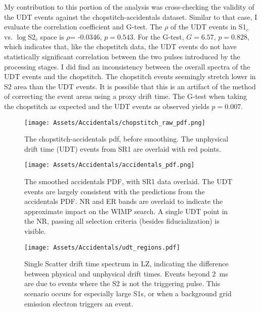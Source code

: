 My contribution to this portion of the analysis was cross-checking the validity of the UDT events against the chopstitch-accidentals dataset.
Similar to that case, I evaluate the correlation coefficient and G-test.
The $\rho$ of the UDT events in S1$_c$ vs. $\log$S2$_c$ space is $\rho$= -0.0346, $p = 0.543$.
For the G-test, $G= 6.57$, $p = 0.828$, which indicates that, like the chopstitch data, the UDT events do not have statistically significant correlation between the two pulses introduced by the processing stages.
I did find an inconsistency between the overall spectra of the UDT events and the chopstitch. 
The chopstitch events seemingly stretch lower in S2 area than the UDT events.
It is possible that this is an artifact of the method of correcting the event areas using a proxy drift time.
The G-test when taking the chopstitch as expected and the UDT events as observed yields $p=0.007$.


\begin{figure}
    \centering
    \texttt{[image: Assets/Accidentals/chopstitch\_raw\_pdf.png]}
    \caption[The chopstitch-accidentals pdf, before smoothing. ]%
    {The chopstitch-accidentals pdf, before smoothing. 
    The unphysical drift time (UDT) events from SR1 are overlaid with red points.}
    \label{fig:chopstitch_pdf}
\end{figure}

\begin{figure}
    \centering
    \texttt{[image: Assets/Accidentals/accidentals\_pdf.png]}
    \caption[The smoothed accidentals PDF, with SR1  data overlaid. ]%
    {The smoothed accidentals PDF, with SR1  data overlaid. 
    The UDT events are largely consistent with the predictions from the accidentals PDF.
    NR and ER bands are overlaid to indicate the approximate impact on the WIMP search.
    A single UDT point in the NR, passing all selection criteria (besides fiducialization) is visible. }
    \label{fig:accidentals_pdf}
\end{figure}


\begin{figure}
    \centering
    \texttt{[image: Assets/Accidentals/udt\_regions.pdf]}
    \caption[Single Scatter drift time spectrum in LZ, indicating the difference between physical and unphysical drift times.]%
    {Single Scatter drift time spectrum in LZ, indicating the difference between physical and unphysical drift times.
    Events beyond 2~ms are due to events where the S2 is not the triggering pulse.
    This scenario occurs for especially large S1s, or when a background grid emission electron triggers an event.}
    \label{fig:udt_def}
\end{figure}
